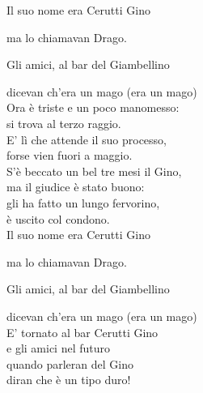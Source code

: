 \documentclass[10pt, twoside, a4paper]{article}
\begin{document}
\begin{multicols}{2}
\hspace{8pt} Il suo nome era Cerutti Gino

\hspace{8pt} ma lo chiamavan Drago.

\hspace{8pt} Gli amici, al bar del Giambellino

\hspace{8pt} dicevan ch'era un mago (era un mago)\\

Ora è triste e un poco manomesso:\\
si trova al terzo raggio.\\
E' lì che attende il suo processo,\\
forse vien fuori a maggio.\\

S'è beccato un bel tre mesi il Gino,\\
ma il giudice è stato buono:\\
gli ha fatto un lungo fervorino,\\
è uscito col condono.\\

\hspace{8pt} Il suo nome era Cerutti Gino

\hspace{8pt} ma lo chiamavan Drago.

\hspace{8pt} Gli amici, al bar del Giambellino

\hspace{8pt} dicevan ch'era un mago (era un mago)\\

E' tornato al bar Cerutti Gino\\
e gli amici nel futuro\\
quando parleran del Gino\\
diran che è un tipo duro!\\
\end{multicols}
\end{document}
